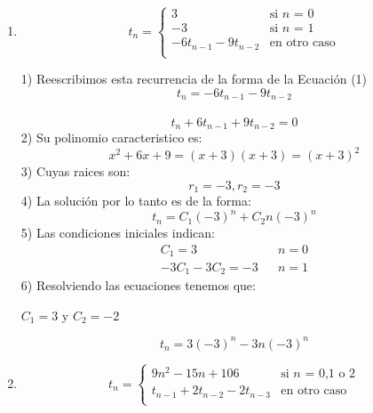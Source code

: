 \documentclass{article}
\theoremstyle{definition}
\theoremstyle{remark}
\begin{document}
\begin{enumerate}[1.]
\item  $$t_n = \left \{ 
\begin{matrix} 
3 & \mbox{si }n\mbox{ = 0}\\ 
-3 & \mbox{si }n\mbox{ = 1}\\
-6t_{n-1}-9t_{n-2}  & \mbox{en}\mbox{ otro caso}\\
\end{matrix}
\right. $$

1) Reescribimos esta recurrencia de la forma de la Ecuaci\'on (1) \\
$$ t_n = -6t_{n-1}-9t_{n-2} $$\\
$$ t_n + 6t_{n-1} + 9t_{n-2} = 0 $$
2) Su polinomio caracteristico es:\\
$$ x^{2}+6x+9=(x+3)(x+3) = (x+3)^2$$
3) Cuyas raices son:\\ 
$$ r_1=-3 , r_2=-3 $$
4) La soluci\'on por lo tanto es de la forma:\\
$$t_n = C_1(-3)^{n} + C_2n(-3)^{n}$$
5) Las condiciones iniciales indican: \\
\begin{align*}
C_{1}=3& & n=0\\
-3C_{1}-3C_{2}=-3& & n=1
\end{align*}
6) Resolviendo las ecuaciones tenemos que:\\
\begin{center}
$C_1=3$ y $C_2=-2$
\end{center}
$$t_n=3(-3)^{n} - 3n(-3)^{n} $$
\clearpage

\item  $$t_n = \left \{ 
\begin{matrix} 
9n^{2} -15n + 106 & \mbox{si }n\mbox{ = 0,1 o 2}\\ 
t_{n-1}+2t_{n-2}-2t_{n-3}  & \mbox{en}\mbox{ otro caso}\\
\end{matrix}
\right. $$


\end{enumerate}
\end{document}
